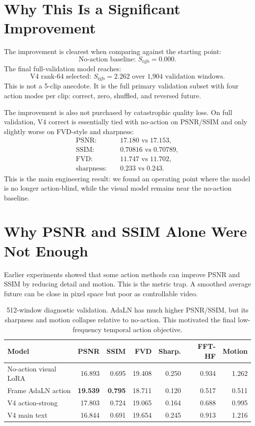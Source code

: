 \documentclass[10pt]{article}
\begin{document}
\section{Why This Is a Significant Improvement}

The improvement is clearest when comparing against the starting point:
\[
\text{No-action baseline: } S_{\mathrm{rgb}}=0.000.
\]
The final full-validation model reaches:
\[
\text{V4 rank-64 selected: } S_{\mathrm{rgb}}=2.262 \text{ over 1,904 validation windows}.
\]
This is not a 5-clip anecdote. It is the full primary validation subset with four action modes per clip: correct, zero, shuffled, and reversed future.

The improvement is also not purchased by catastrophic quality loss. On full validation, V4 correct is essentially tied with no-action on PSNR/SSIM and only slightly worse on FVD-style and sharpness:
\[
\begin{aligned}
\mathrm{PSNR}:&\quad 17.180 \text{ vs } 17.153,\\
\mathrm{SSIM}:&\quad 0.70816 \text{ vs } 0.70789,\\
\mathrm{FVD}:&\quad 11.747 \text{ vs } 11.702,\\
\mathrm{sharpness}:&\quad 0.233 \text{ vs } 0.243.
\end{aligned}
\]
This is the main engineering result: we found an operating point where the model is no longer action-blind, while the visual model remains near the no-action baseline.

\section{Why PSNR and SSIM Alone Were Not Enough}

Earlier experiments showed that some action methods can improve PSNR and SSIM by reducing detail and motion. This is the metric trap. A smoothed average future can be close in pixel space but poor as controllable video.

\begin{table}[H]
\centering
\caption{512-window diagnostic validation. AdaLN has much higher PSNR/SSIM, but its sharpness and motion collapse relative to no-action. This motivated the final low-frequency temporal action objective.}
\small
\begin{tabular}{lrrrrrr}
\toprule
\textbf{Model} & \textbf{PSNR} & \textbf{SSIM} & \textbf{FVD} & \textbf{Sharp.} & \textbf{FFT-HF} & \textbf{Motion} \\
\midrule
No-action visual LoRA & 16.893 & 0.695 & 19.408 & 0.250 & 0.934 & 1.262 \\
Frame AdaLN action & \textbf{19.539} & \textbf{0.795} & 18.711 & 0.120 & 0.517 & 0.511 \\
V4 action-strong & 17.803 & 0.724 & 19.065 & 0.164 & 0.688 & 0.995 \\
V4 main text & 16.844 & 0.691 & 19.654 & 0.245 & 0.913 & 1.216 \\
\bottomrule
\end{tabular}
\end{table}
\end{document}
